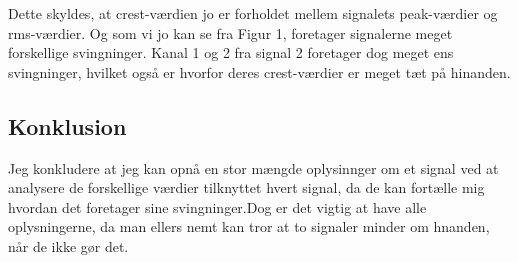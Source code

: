 \documentclass[../main.tex]{subfiles}
\begin{document}
Dette skyldes, at crest-værdien jo er forholdet mellem signalets peak-værdier og rms-værdier. Og som vi jo kan se fra Figur 1, foretager signalerne meget forskellige svingninger. Kanal 1 og 2 fra signal 2 foretager dog meget ens svingninger, hvilket også er hvorfor deres crest-værdier er meget tæt på hinanden.

\subsection{Konklusion}

Jeg konkludere at jeg kan opnå en stor mængde oplysinnger om et signal ved at analysere de forskellige værdier tilknyttet hvert signal, da de kan fortælle mig hvordan det foretager sine svingninger.Dog er det vigtig at have alle oplysningerne, da man ellers nemt kan tror at to signaler minder om hnanden, når de ikke gør det.
\end{document}
